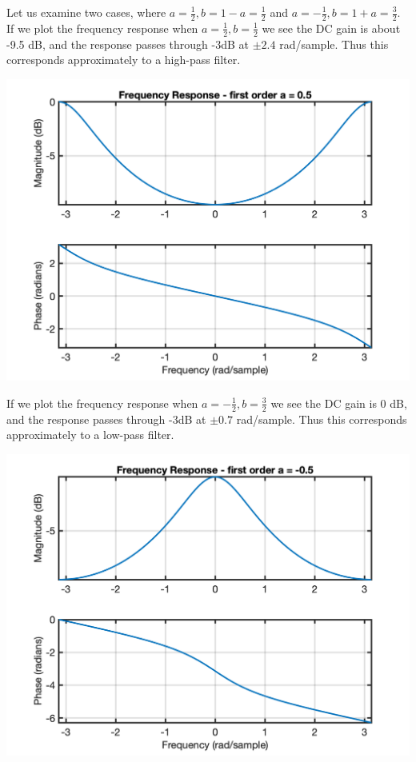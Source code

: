 \begin{example}
Let us examine two cases, where $a = \tfrac{1}{2}, b=1-a = \tfrac{1}{2}$ and $a = -\tfrac{1}{2}, b=1+a = \tfrac{3}{2}$. If we plot the frequency response when $a = \tfrac{1}{2}, b=\tfrac{1}{2}$ we see the DC gain is about -9.5 dB, and the response passes through -3dB at $\pm 2.4$ rad/sample. Thus this corresponds approximately to a high-pass filter. 
\begin{center}   
  \includegraphics[scale=0.7]{graphics/lecture25_1.png}
\end{center}
If we plot the frequency response when $a = -\tfrac{1}{2}, b=\tfrac{3}{2}$ we see the DC gain is 0 dB, and the response passes through -3dB at $\pm 0.7$ rad/sample. Thus this corresponds approximately to a low-pass filter. 
\begin{center}   
  \includegraphics[scale=0.7]{graphics/lecture25_2.png}
\end{center}

\end{example}

